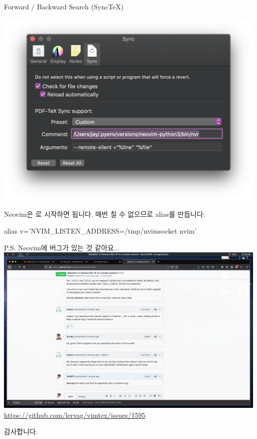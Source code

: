 \documentclass{beamer}
\begin{document}
\begin{frame}[fragile]{Forward / Backward Search (Sync\TeX)}
  \begin{center}
    \includegraphics[width=0.6\linewidth]{figures/skim-sync}
  \end{center}

  Neovim은 로 시작하면
  됩니다.
  매번 칠 수 없으므로 alias를 만듭니다:
  \begin{shellcode}
    alias v='NVIM_LISTEN_ADDRESS=/tmp/nvimsocket nvim'
  \end{shellcode}
\end{frame}

\begin{frame}{P.S. Neovim에 버그가 있는 것 같아요...}
  \centering\includegraphics[width=\linewidth]{figures/neovim-issue}
  \url{https://github.com/lervag/vimtex/issues/1595}
\end{frame}

\begin{frame}[standout]
  감사합니다.
\end{frame}
\end{document}
